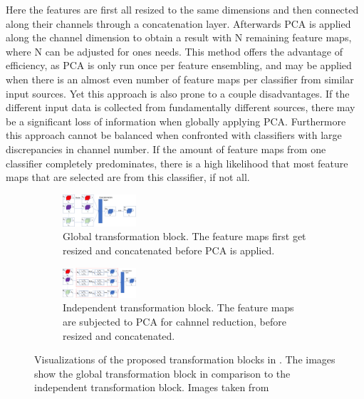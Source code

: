 Here the features are first all resized to the same dimensions and then connected along their channels through a concatenation layer.
Afterwards PCA is applied along the channel dimension to obtain a result with N remaining feature maps, where N can be adjusted for ones 
needs. This method offers the advantage of efficiency, as PCA is only run once per feature ensembling, and may be applied when there is 
an almost even number of feature maps per classifier from similar input sources. Yet this approach is also 
prone to a couple disadvantages. If the different input data is collected from fundamentally different sources, there may be a significant 
loss of information when globally applying PCA. Furthermore this approach cannot be balanced when confronted with classifiers with large 
discrepancies in channel number. If the amount of feature maps from one classifier completely predominates, there is a high likelihood 
that most feature maps that are selected are from this classifier, if not all.

\begin{figure}[htbp]
    \captionsetup[subfigure]{justification=centering}
    \centering
    \begin{subfigure}[b]{0.3\textwidth} %
        \centering
        \includegraphics[width=0.3\textwidth]{figures/global_transformation_block.jpg}
        \caption{Global transformation block. The feature maps first get resized and concatenated before PCA is applied.}
        \label{fig:GTBheller}
    \end{subfigure}
    \hspace{0.05\textwidth} %
    \begin{subfigure}[b]{0.3\textwidth} %
        \centering
        \includegraphics[width=0.3\textwidth]{figures/independent_transformation_block.jpg}
        \caption{Independent transformation block. The feature maps are subjected to PCA for cahnnel reduction, before resized and concatenated.}
        \label{fig:ITBheller}
    \end{subfigure}
    
    \caption{Visualizations of the proposed transformation blocks in \cite{EnsembleHeller2023}. The images show the global transformation 
             block in comparison to the independent transformation block. Images taken from \cite{EnsembleHeller2023}}
    \label{fig:hellerensembleblocks}
\end{figure}




